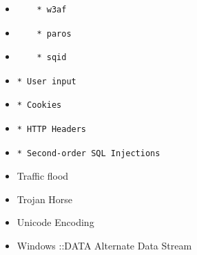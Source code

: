\begin{itemize}
\begin{verbatim}
    * wapiti
\end{verbatim}
\item
\begin{verbatim}
    * w3af
\end{verbatim}
\item
\begin{verbatim}
    * paros
\end{verbatim}
\item
\begin{verbatim}
    * sqid
\end{verbatim}
\item
\begin{verbatim}
* User input
\end{verbatim}
\item
\begin{verbatim}
* Cookies
\end{verbatim}
\item
\begin{verbatim}
* HTTP Headers
\end{verbatim}
\item
\begin{verbatim}
* Second-order SQL Injections
\end{verbatim}
\item
  Traffic flood
\item
  Trojan Horse
\item
  Unicode Encoding
\item
  Windows ::DATA Alternate Data Stream
\end{itemize}